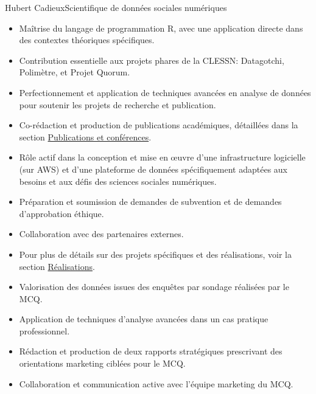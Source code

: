 \documentclass{article}
\begin{document}
\begin{cv}[avatar]{Hubert Cadieux}{Scientifique de données sociales numériques}
\begin{cvevent}[2021][présent]
    \begin{itemize}
        \item Maîtrise du langage de programmation R, avec une application directe dans des contextes théoriques spécifiques.
        \item Contribution essentielle aux projets phares de la CLESSN: Datagotchi, Polimètre, et Projet Quorum.
        \item Perfectionnement et application de techniques avancées en analyse de données pour soutenir les projets de recherche et publication.
        \item Co-rédaction et production de publications académiques, détaillées dans la section \hyperref[sec:publications]{Publications et conférences}.
        \item Rôle actif dans la conception et mise en œuvre d'une infrastructure logicielle (sur AWS) et d'une plateforme de données spécifiquement adaptées aux besoins et aux défis des sciences sociales numériques.
        \item Préparation et soumission de demandes de subvention et de demandes d'approbation éthique.
        \item Collaboration avec des partenaires externes.
        \item Pour plus de détails sur des projets spécifiques et des réalisations, voir la section \hyperref[sec:realisations]{Réalisations}.\\[10pt]
    \end{itemize}
\end{cvevent}

\begin{cvevent}[2022][2024]
    \begin{itemize}
        \item Valorisation des données issues des enquêtes par sondage réalisées par le MCQ.
        \item Application de techniques d'analyse avancées dans un cas pratique professionnel.
        \item Rédaction et production de deux rapports stratégiques prescrivant des orientations marketing ciblées pour le MCQ.
        \item Collaboration et communication active avec l'équipe marketing du MCQ.\\[10pt]
    \end{itemize}
\end{cvevent}


\end{cv}
\end{document}
